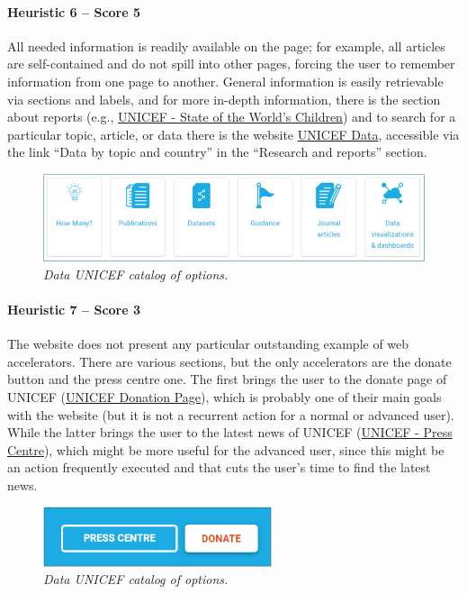 \paragraph*{Heuristic 6 – Score 5}
All needed information is readily available on the page; for example, all articles are self-contained and do not spill into other pages, forcing the user to remember information from one page to another. General information is easily retrievable via sections and labels, and for more in-depth information, there is the section about reports (e.g., \href{https://www.unicef.org/reports/state-of-worlds-children}{UNICEF - State of the World's Children}) and to search for a particular topic, article, or data there is the website \href{https://data.unicef.org/}{UNICEF Data}, accessible via the link “Data by topic and country” in the “Research and reports” section.
\begin{figure}[h]
	\includegraphics[width=\textwidth]{Picture10.png}
	\captionsetup{font=small}
	\caption{\textit{Data UNICEF catalog of options.}}
	\label{fig:label10}
\end{figure}

\paragraph*{Heuristic 7 – Score 3}
The website does not present any particular outstanding example of web accelerators. There are various sections, but the only accelerators are the donate button and the press centre one. The first brings the user to the donate page of UNICEF (\href{https://donazioni.unicef.it/}{UNICEF Donation Page}), which is probably one of their main goals with the website (but it is not a recurrent action for a normal or advanced user). While the latter brings the user to the latest news of UNICEF (\href{https://www.unicef.org/media/press-centre}{UNICEF - Press Centre}), which might be more useful for the advanced user, since this might be an action frequently executed and that cuts the user’s time to find the latest news.
\begin{figure}[h]
	\centering
	\begin{center}
		\includegraphics[width=0.6\textwidth]{Picture11.png}
	\end{center}
	\captionsetup{font=small}
	\caption{\textit{Data UNICEF catalog of options.}}
	\label{fig:label11}
\end{figure}

